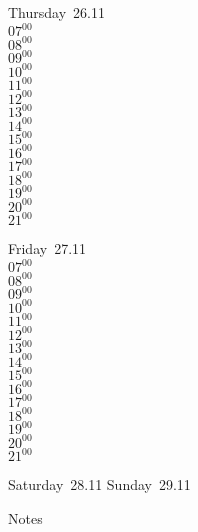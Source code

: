 \documentclass[11pt,a4paper]{book}\usepackage[]{graphicx}\usepackage[]{color}
\begin{document}
\clearpage
\begin{headerbox}
\end{headerbox}
\begin{weekdaybox}
  Thursday~26.11\\
  { 
  \vfill
  $07^{00}$\\
$08^{00}$\\
$09^{00}$\\
$10^{00}$\\
$11^{00}$\\
$12^{00}$\\
$13^{00}$\\
$14^{00}$\\
$15^{00}$\\
$16^{00}$\\
$17^{00}$\\
$18^{00}$\\
$19^{00}$\\
$20^{00}$\\
$21^{00}$\\
  }
\end{weekdaybox} 
\begin{weekdaybox}
  Friday~27.11\\
  { 
  \vfill
  $07^{00}$\\
$08^{00}$\\
$09^{00}$\\
$10^{00}$\\
$11^{00}$\\
$12^{00}$\\
$13^{00}$\\
$14^{00}$\\
$15^{00}$\\
$16^{00}$\\
$17^{00}$\\
$18^{00}$\\
$19^{00}$\\
$20^{00}$\\
$21^{00}$\\
  }
\end{weekdaybox}
\begin{weekendbox}
  Saturday~28.11
  \tcblower
  Sunday~29.11
\end{weekendbox} %
\begin{notebox}
  Notes
\end{notebox}
\clearpage
\end{document}
